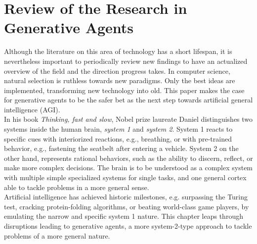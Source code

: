\section{Review of the Research in Generative Agents}
Although the literature on this area of technology has a short lifespan, it is nevertheless important to periodically review new findings to have an actualized overview of the field and the direction progress takes. In computer science, natural selection is ruthless towards new paradigms. Only the best ideas are implemented, transforming new technology into old. This paper makes the case for generative agents to be the safer bet as the next step towards artificial general intelligence (AGI). \\
In his book \textit{Thinking, fast and slow}, Nobel prize laureate Daniel \textcite{kahneman_thinking_2012} distinguishes two systems inside the human brain, \textit{system 1} and \textit{system 2}. System 1 reacts to specific cues with interiorized reactions, e.g., breathing, or with pre-trained behavior, e.g., fastening the seatbelt after entering a vehicle. System 2 on the other hand, represents rational behaviors, such as the ability to discern, reflect, or make more complex decisions. The brain is to be understood as a complex system with multiple simple specialized systems for single tasks, and one general cortex able to tackle problems in a more general sense. \\
Artificial intelligence has achieved historic milestones, e.g. surpassing the Turing test, cracking protein-folding algorithms, or beating world-class game players, by emulating the narrow and specific system 1 nature. This chapter leaps through disruptions leading to generative agents, a more system-2-type approach to tackle problems of a more general nature.
